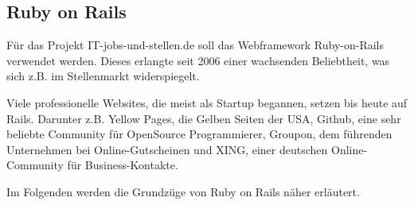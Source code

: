 \subsection{Ruby on Rails}

Für das Projekt IT-jobs-und-stellen.de soll das Webframework Ruby-on-Rails verwendet werden. 
Dieses erlangte seit 2006 einer wachsenden Beliebtheit, was sich z.B. im Stellenmarkt widerspiegelt.

Viele professionelle Websites, die meist als Startup begannen, setzen bis heute auf Rails. Darunter z.B. Yellow Pages, die Gelben Seiten der USA, Github, eine sehr beliebte Community für OpenSource Programmierer,  Groupon, dem führenden Unternehmen bei Online-Gutscheinen und XING, einer deutschen Online-Community für Business-Kontakte.

Im Folgenden werden die Grundzüge von Ruby on Rails näher erläutert.





